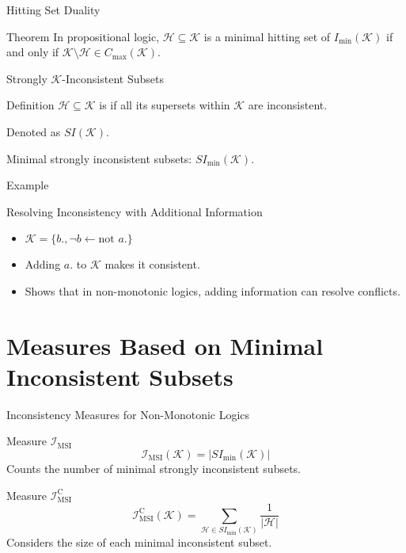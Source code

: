 \begin{frame}{Hitting Set Duality}
    \begin{block}{Theorem}
        In propositional logic, $\mathcal{H} \subseteq \mathcal{K}$ is a minimal hitting set of $I_{\min}(\mathcal{K})$ if and only if $\mathcal{K} \setminus \mathcal{H} \in C_{\max}(\mathcal{K})$.
    \end{block}
\end{frame}

\begin{frame}{Strongly $\mathcal{K}$-Inconsistent Subsets}
    \begin{block}{Definition}
        $\mathcal{H} \subseteq \mathcal{K}$ is  if all its supersets within $\mathcal{K}$ are inconsistent.

        Denoted as $SI(\mathcal{K})$.

        Minimal strongly inconsistent subsets: $SI_{\min}(\mathcal{K})$.
    \end{block}
\end{frame}

\begin{frame}{Example}
    \begin{exampleblock}{Resolving Inconsistency with Additional Information}
        \begin{itemize}
            \item $\mathcal{K} = \{b., \neg b \leftarrow \text{not } a.\}$
            \item Adding $a.$ to $\mathcal{K}$ makes it consistent.
            \item Shows that in non-monotonic logics, adding information can resolve conflicts.
        \end{itemize}
    \end{exampleblock}
\end{frame}

\section{Measures Based on Minimal Inconsistent Subsets}

\begin{frame}{Inconsistency Measures for Non-Monotonic Logics}
    \begin{block}{Measure $\mathcal{I}_{\text{MSI}}$}
        \[
            \mathcal{I}_{\text{MSI}}(\mathcal{K}) = \left| SI_{\min}(\mathcal{K}) \right|
        \]
        Counts the number of minimal strongly inconsistent subsets.
    \end{block}
    \begin{block}{Measure $\mathcal{I}_{\text{MSI}}^\text{C}$}
        \[
            \mathcal{I}_{\text{MSI}}^\text{C}(\mathcal{K}) = \sum_{\mathcal{H} \in SI_{\min}(\mathcal{K})} \frac{1}{|\mathcal{H}|}
        \]
        Considers the size of each minimal inconsistent subset.
    \end{block}
\end{frame}

